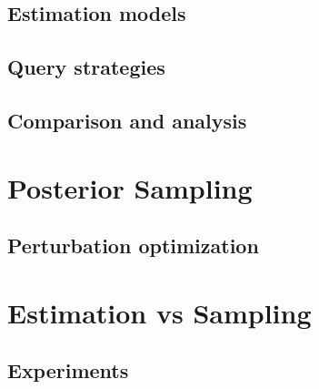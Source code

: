 \subsection{Estimation models}

\subsection{Query strategies}

\subsection{Comparison and analysis}


\section{Posterior Sampling}

\label{sec:sampling}

\subsection{Perturbation optimization}



\section{Estimation vs Sampling}

\subsection{Experiments}
